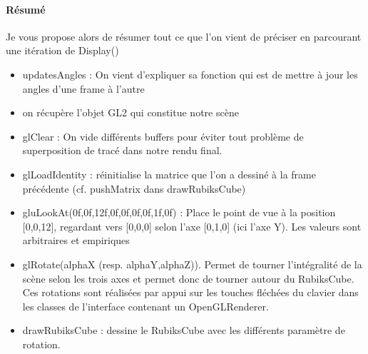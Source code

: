 \paragraph{Résumé}
Je vous propose alors de résumer tout ce que l’on vient de préciser en parcourant une itération de Display()
\begin{itemize}
   \item  updatesAngles : On vient d’expliquer sa fonction qui est de mettre à jour les angles d’une frame à l’autre

    \item on récupère l’objet GL2 qui constitue notre scène

    \item glClear : On vide différents buffers pour éviter tout problème de superposition de tracé dans notre rendu final.

    \item glLoadIdentity : réinitialise la matrice que l’on a dessiné à la frame précédente (cf. pushMatrix dans drawRubiksCube)

    \item gluLookAt(0f,0f,12f,0f,0f,0f,0f,1f,0f) : Place le point de vue à la position [0,0,12], regardant vers [0,0,0] selon l’axe [0,1,0] (ici l’axe Y). Les valeurs sont arbitraires et empiriques

    \item glRotate(alphaX (resp. alphaY,alphaZ)). Permet de tourner l’intégralité de la scène selon les trois axes et permet donc de tourner autour du RubiksCube. Ces rotations sont réalisées par appui sur les touches fléchées du clavier dans les classes de l’interface contenant un OpenGLRenderer.

    \item drawRubiksCube : dessine le RubiksCube avec les différents paramètre de rotation.
\end{itemize}

